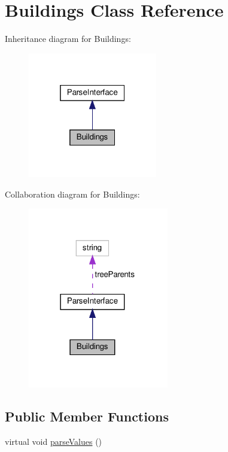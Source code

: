 \hypertarget{classBuildings}{}\section{Buildings Class Reference}
\label{classBuildings}


Inheritance diagram for Buildings\+:
\nopagebreak
\begin{figure}[H]
\begin{center}
\leavevmode
\includegraphics[width=160pt]{classBuildings__inherit__graph}
\end{center}
\end{figure}


Collaboration diagram for Buildings\+:
\nopagebreak
\begin{figure}[H]
\begin{center}
\leavevmode
\includegraphics[width=174pt]{classBuildings__coll__graph}
\end{center}
\end{figure}
\subsection*{Public Member Functions}
\begin{DoxyCompactItemize}
\item 
virtual void \hyperlink{classBuildings_a97851dd190977ba999ecb1f50481c400}{parse\+Values} ()
\end{DoxyCompactItemize}
